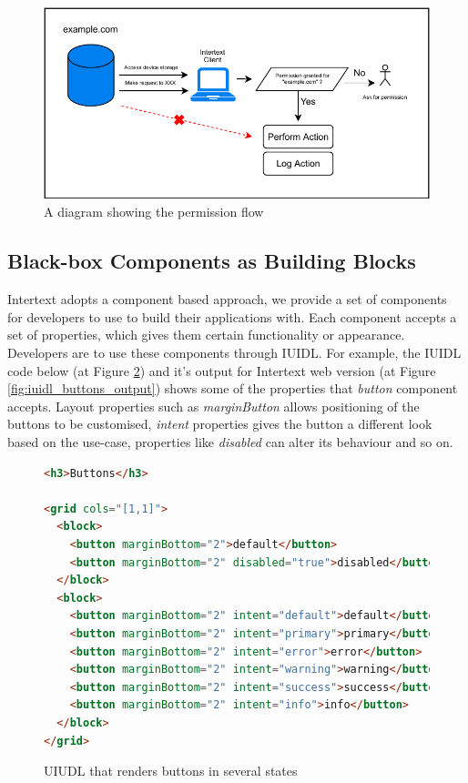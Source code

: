 \begin{figure}
  \centering
  \includegraphics[width=13cm]{thesis/paper/images/permission.pdf}
  \caption{A diagram showing the permission flow}%
  \label{fig:permission_flow}%
\end{figure}


\subsection{Black-box Components as Building Blocks}

Intertext adopts a component based approach, we provide a set of components for developers to use to build their applications with. Each component accepts a set of properties, which gives them certain functionality or appearance. Developers are to use these components through IUIDL. For example, the IUIDL code below (at Figure \ref{fig:iuidl_buttons}) and it's output for Intertext web version (at Figure \ref{fig:iuidl_buttons_output}) shows some of the properties that \textit{button} component accepts. Layout properties such as  \textit{marginButton} allows positioning of the buttons to be customised, \textit{intent} properties gives the button a different look based on the use-case, properties like \textit{disabled} can alter its behaviour and so on.

\begin{figure}
\begin{minipage}{\linewidth}
\begin{lstlisting}[language=html]
<h3>Buttons</h3>

<grid cols="[1,1]">
  <block>
    <button marginBottom="2">default</button>
    <button marginBottom="2" disabled="true">disabled</button>
  </block>
  <block>
    <button marginBottom="2" intent="default">default</button>
    <button marginBottom="2" intent="primary">primary</button>
    <button marginBottom="2" intent="error">error</button>
    <button marginBottom="2" intent="warning">warning</button>
    <button marginBottom="2" intent="success">success</button>
    <button marginBottom="2" intent="info">info</button>
  </block>
</grid>
\end{lstlisting}
\end{minipage}
\caption{UIUDL that renders buttons in several states}%
\label{fig:iuidl_buttons}%
\end{figure}

